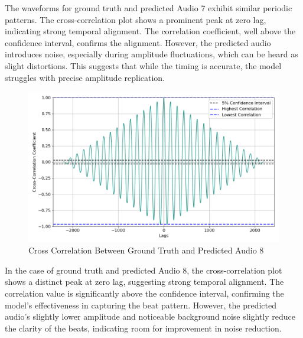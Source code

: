 \documentclass{ioereport}
\begin{document}
    The waveforms for ground truth and predicted Audio 7 exhibit similar periodic patterns. The cross-correlation plot shows a prominent peak at zero lag, indicating strong temporal alignment. The correlation coefficient, well above the confidence interval, confirms the alignment. However, the predicted audio introduces noise, especially during amplitude fluctuations, which can be heard as slight distortions. This suggests that while the timing is accurate, the model struggles with precise amplitude replication.

    \begin{figure}[H]
        \centering
        \includegraphics[width=\linewidth]{assets/crosscorrelation/cross_correlation_multitoneBeats.wav_multitoneBeatspred.wav.png}
        \caption{Cross Correlation Between Ground Truth and Predicted Audio 8}
        \label{fig:cross-correlation-8}
    \end{figure}

    In the case of ground truth and predicted Audio 8, the cross-correlation plot shows a distinct peak at zero lag, suggesting strong temporal alignment. The correlation value is significantly above the confidence interval, confirming the model's effectiveness in capturing the beat pattern. However, the predicted audio's slightly lower amplitude and noticeable background noise slightly reduce the clarity of the beats, indicating room for improvement in noise reduction.
\end{document}
